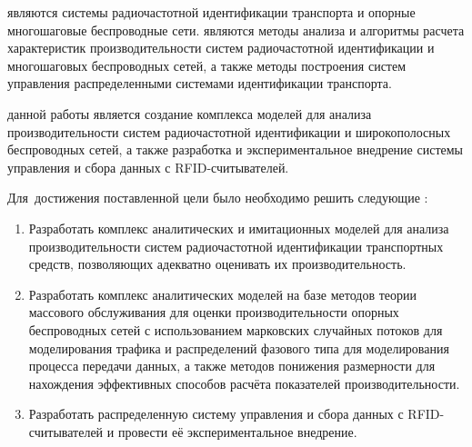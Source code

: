 
{\object} являются системы радиочастотной идентификации транспорта и опорные многошаговые беспроводные сети. {\objective} являются методы анализа и алгоритмы расчета характеристик производительности систем радиочастотной идентификации и многошаговых беспроводных сетей, а также методы построения систем управления распределенными системами идентификации транспорта.

{\aim} данной работы является создание комплекса моделей для анализа производительности систем радиочастотной идентификации и широкополосных беспроводных сетей, а также разработка и экспериментальное внедрение системы управления и сбора данных с RFID-считывателей.

Для~достижения поставленной цели было необходимо решить следующие {\tasks}:
\begin{enumerate}[beginpenalty=10000] %
  \item Разработать комплекс аналитических и имитационных моделей для анализа производительности систем радиочастотной идентификации транспортных средств, позволяющих адекватно оценивать их производительность.
  \item Разработать комплекс аналитических моделей на базе методов теории массового обслуживания для оценки производительности опорных беспроводных сетей с использованием марковских случайных потоков для моделирования трафика и распределений фазового типа для моделирования процесса передачи данных, а также методов понижения размерности для нахождения эффективных способов расчёта показателей производительности.
  \item Разработать распределенную систему управления и сбора данных с RFID-считывателей и провести её экспериментальное внедрение.
\end{enumerate}


